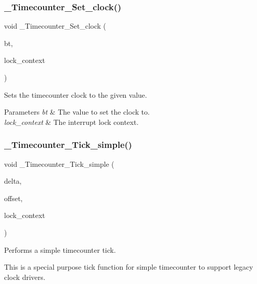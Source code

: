 \subsubsection{\texorpdfstring{\_Timecounter\_Set\_clock()}{\_Timecounter\_Set\_clock()}}
{\footnotesize\ttfamily void \+\_\+\+Timecounter\+\_\+\+Set\+\_\+clock (\begin{DoxyParamCaption}\item[{const struct bintime $\ast$}]{bt,  }\item[{\mbox{\hyperlink{structISR__lock__Context}{I\+S\+R\+\_\+lock\+\_\+\+Context}} $\ast$}]{lock\+\_\+context }\end{DoxyParamCaption})}



Sets the timecounter clock to the given value. 


\begin{DoxyParams}{Parameters}
{\em bt} & The value to set the clock to. \\
\hline
{\em lock\+\_\+context} & The interrupt lock context. \\
\hline
\end{DoxyParams}
\mbox{\label{group__RTEMSScoreTimecounter_ga4846ddfe4d962ac1cc41c022f7ae0d60}} 
\subsubsection{\texorpdfstring{\_Timecounter\_Tick\_simple()}{\_Timecounter\_Tick\_simple()}}
{\footnotesize\ttfamily void \+\_\+\+Timecounter\+\_\+\+Tick\+\_\+simple (\begin{DoxyParamCaption}\item[{uint32\+\_\+t}]{delta,  }\item[{uint32\+\_\+t}]{offset,  }\item[{\mbox{\hyperlink{structISR__lock__Context}{I\+S\+R\+\_\+lock\+\_\+\+Context}} $\ast$}]{lock\+\_\+context }\end{DoxyParamCaption})}



Performs a simple timecounter tick. 

This is a special purpose tick function for simple timecounter to support legacy clock drivers.


